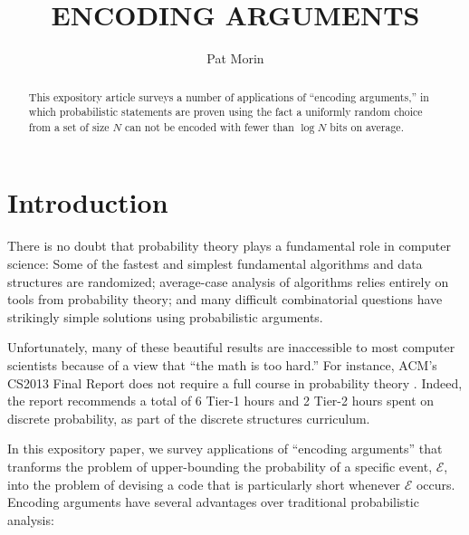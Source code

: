 \documentclass[lotsofwhite]{patmorin}
\title{\MakeUppercase{Encoding Arguments}}
\author{Pat Morin}
\date{}
\begin{document}
\begin{titlepage}
\maketitle

\begin{abstract}
\setlength{\baselineskip}{15.84pt}
This expository article surveys a number of applications of ``encoding
arguments,'' in which probabilistic statements are proven using the fact
a uniformly random choice from a set of size $N$ can not be encoded with
fewer than $\log N$ bits on average.
\end{abstract}


\end{titlepage}
\tableofcontents
\newpage
{}

\section{Introduction}

There is no doubt that probability theory plays a fundamental role
in computer science: Some of the fastest and simplest fundamental
algorithms and data structures are randomized; average-case analysis of
algorithms relies entirely on tools from probability theory; and many
difficult combinatorial questions have strikingly simple solutions using
probabilistic arguments.

Unfortunately, many of these beautiful results are inaccessible to most
computer scientists because of a view that ``the math is too hard.''
For instance, ACM's CS2013 Final Report does not require a full course
in probability theory \cite[Page~50]{acm2013}. Indeed, the report
recommends a total of 6 Tier-1 hours and 2 Tier-2 hours spent on discrete
probability, as part of the discrete structures curriculum.

In this expository paper, we survey applications of ``encoding arguments''
that tranforms the problem of upper-bounding the probability of a
specific event, $\mathcal{E}$, into the problem of devising a code that
is particularly short whenever $\mathcal{E}$ occurs.  Encoding arguments
have several advantages over traditional probabilistic analysis:
\end{document}
